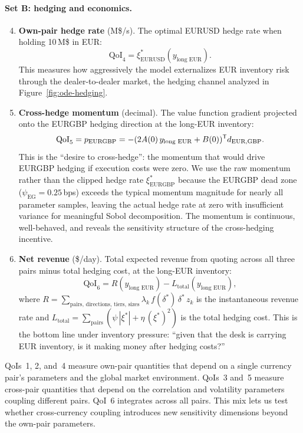 \paragraph{Set B: hedging and economics.}

\begin{enumerate}
  \setcounter{enumi}{3}
  \item \textbf{Own-pair hedge rate} (M\$/s). The optimal EURUSD hedge rate when holding 10\,M\$ in EUR:
  \[
    \text{QoI}_4 = \xi^*_{\text{EURUSD}}(y_{\text{long EUR}}).
  \]
  This measures how aggressively the model externalizes EUR inventory risk through the dealer-to-dealer market, the hedging channel analyzed in Figure~\ref{fig:ode-hedging}.

  \item \textbf{Cross-hedge momentum} (decimal). The value function gradient projected onto the EURGBP hedging direction at the long-EUR inventory:
  \[
    \text{QoI}_5 = p_{\text{EURGBP}} = -(2A(0)\,y_{\text{long EUR}} + B(0))^{\mathsf{T}} d_{\text{EUR,GBP}}.
  \]
  This is the ``desire to cross-hedge'': the momentum that would drive EURGBP hedging if execution costs were zero. We use the raw momentum rather than the clipped hedge rate $\xi^*_{\text{EURGBP}}$ because the EURGBP dead zone ($\psi_{\text{EG}} = 0.25$\,bps) exceeds the typical momentum magnitude for nearly all parameter samples, leaving the actual hedge rate at zero with insufficient variance for meaningful Sobol decomposition. The momentum is continuous, well-behaved, and reveals the sensitivity structure of the cross-hedging incentive.

  \item \textbf{Net revenue} (\$/day). Total expected revenue from quoting across all three pairs minus total hedging cost, at the long-EUR inventory:
  \[
    \text{QoI}_6 = R(y_{\text{long EUR}}) - L_{\text{total}}(y_{\text{long EUR}}),
  \]
  where $R = \sum_{\text{pairs, directions, tiers, sizes}} \lambda_k\,f(\delta^*)\,\delta^*\,z_k$ is the instantaneous revenue rate and $L_{\text{total}} = \sum_{\text{pairs}} (\psi\,|\xi^*| + \eta\,(\xi^*)^2)$ is the total hedging cost. This is the bottom line under inventory pressure: ``given that the desk is carrying EUR inventory, is it making money after hedging costs?''
\end{enumerate}

QoIs~1, 2, and~4 measure own-pair quantities that depend on a single currency pair's parameters and the global market environment. QoIs~3 and~5 measure cross-pair quantities that depend on the correlation and volatility parameters coupling different pairs. QoI~6 integrates across all pairs. This mix lets us test whether cross-currency coupling introduces new sensitivity dimensions beyond the own-pair parameters.


